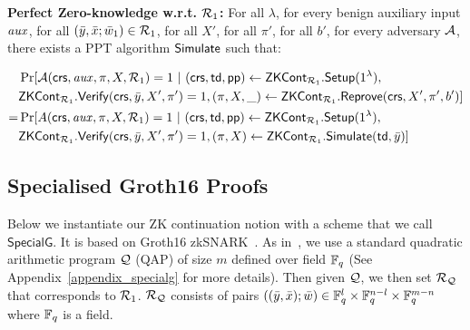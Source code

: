 \begin{definition}[ZK Continuation]
\noindent \textbf{Perfect Zero-knowledge w.r.t. $\mathcal{R}_1$:} For all $\lambda$, for every benign auxiliary input $\mathit{aux}$, 
for all  $(\bar{y}, \bar{x}; \bar{w}_1) \in \mathcal{R}_1$, for all $X'$, for all $\pi'$, for all $b'$, for every adversary $\mathcal{A}$, there exists a PPT algorithm $ {\mathsf{Simulate}} $ such that:
\begin{footnotesize}
\begin{align*}
& \Pr [\mathcal{A}(\mathsf{crs}, \mathit{aux}, \pi, X, \mathcal{R}_1) = 1 \ | \ (\mathsf{crs}, \mathsf{td}, \mathsf{pp}) \leftarrow {\ensuremath{\mathsf{ZKCont}}}_{\mathcal{R}_1}.{\mathsf{Setup}} (1^{\lambda}), 
\\& {\mathsf{ZKCont}}_{\mathcal{R}_1}.{\mathsf{Verify}}(\mathsf{crs}, \bar{y}, X', \pi') = 1,  (\pi, X, \_) \leftarrow {\ensuremath{\mathsf{ZKCont}}}_{\mathcal{R}_1}.{\mathsf{Reprove}} (\mathsf{crs}, X', \pi', b')] \\
= & \Pr[A(\mathsf{crs}, \mathit{aux}, \pi, X, \mathcal{R}_1) = 1 \ | \ (\mathsf{crs}, \mathsf{td}, \mathsf{pp}) \leftarrow {\ensuremath{\mathsf{ZKCont}}}_{\mathcal{R}_1}.{\mathsf{Setup}} (1^{\lambda}), \\ 
                        & {\mathsf{ZKCont}}_{\mathcal{R}_1}.{\mathsf{Verify}}(\mathsf{crs}, \bar{y}, X', \pi') = 1,  (\pi, X) \leftarrow {\ensuremath{\mathsf{ZKCont}}}_{\mathcal{R}_1}.{\mathsf{Simulate}}(\mathsf{td}, \bar{y})]
\end{align*}

\end{footnotesize}


\end{definition} 



\subsection{Specialised Groth16 Proofs}
\label{sec:rvrf_groth16}

Below we instantiate our ZK continuation notion with a scheme that we call  \emph{$\mathsf{SpecialG}$}. It is based on Groth16 zkSNARK~\cite{Groth16}.
As in~\cite{Groth16}, we use a standard quadratic arithmetic program $ \mathcal{Q} $ (QAP) of size $ m $ defined over field $ \mathbb{F}_q $ (See Appendix~\ref{appendix_specialg} for more details). Then given $ \mathcal{Q} $, we then set  $ \mathcal{R}_{\mathcal{Q}}  $ that corresponds to $ \mathcal{R}_1 $. $ \mathcal{R}_{\mathcal{Q}} $  consists of pairs $((\bar{y}, \bar{x}); \bar{w}) \in \mathbb{F}_q^{l} \times \mathbb{F}_q^{n-l} \times \mathbb{F}_q^{m-n}$ where $\mathbb{F}_q$ is a field.  



